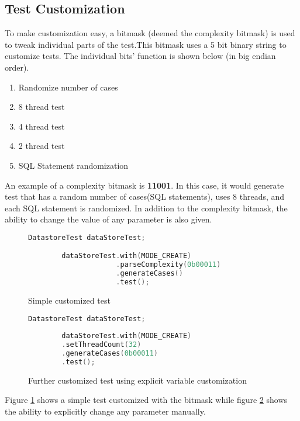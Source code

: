 \documentclass[letterpaper, 11pt]{article}
\begin{document}
\subsection{Test Customization}

To make customization easy, a bitmask (deemed the complexity bitmask) is used to tweak individual parts of the test.This bitmask uses a 5 bit binary string to customize tests. The individual bits' function is shown below (in big endian order).

\begin{enumerate}
	\item Randomize number of cases
	\item 8 thread test
	\item 4 thread test
	\item 2 thread test
	\item SQL Statement randomization
\end{enumerate}

An example of a complexity bitmask is {\bfseries 11001}. In this case, it would generate test that has a random number of cases(SQL statements), uses 8 threads, and each SQL statement is randomized. In addition to the complexity bitmask, the ability to change the value of any parameter is also given. 

  \begin{figure}[H]
  	\begin{lstlisting}[language=C++]
		DatastoreTest dataStoreTest;

		dataStoreTest.with(MODE_CREATE)
					 .parseComplexity(0b00011)
					 .generateCases()
					 .test();
  	\end{lstlisting}
  	\caption{Simple customized test}
  	\label{testharnesscode}
  \end{figure}
  
    \begin{figure}[H]
    	\begin{lstlisting}[language=C++]
    	DatastoreTest dataStoreTest;
    	
    	dataStoreTest.with(MODE_CREATE)
    	.setThreadCount(32)
    	.generateCases(0b00011)
    	.test();
    	\end{lstlisting}
    	\caption{Further customized test using explicit variable customization}
    	\label{testharnesscustomized}
    \end{figure}
    
    
    Figure \ref{testharnesscode} shows a simple test customized with the bitmask while figure \ref{testharnesscustomized}
    shows the ability to explicitly change any parameter manually.
    
\end{document}
